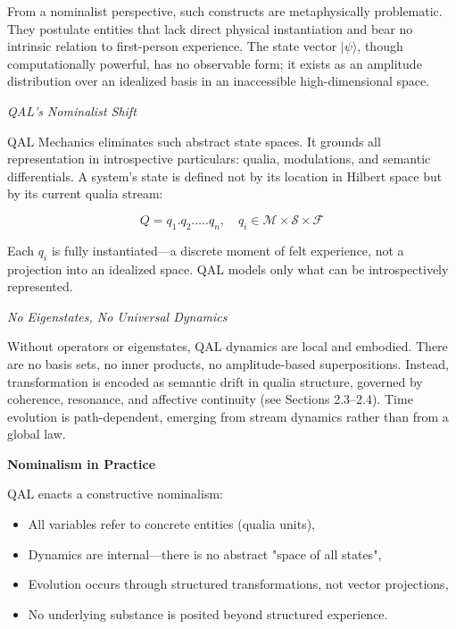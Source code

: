 \documentclass[11pt]{article}
\numberwithin{equation}{section} %
\begin{document}
From a nominalist perspective, such constructs are metaphysically problematic. They postulate entities that lack direct physical instantiation and bear no intrinsic relation to first-person experience. The state vector \( |\psi\rangle \), though computationally powerful, has no observable form; it exists as an amplitude distribution over an idealized basis in an inaccessible high-dimensional space.

\bigskip

\textit{QAL's Nominalist Shift}

QAL Mechanics eliminates such abstract state spaces. It grounds all representation in introspective particulars: qualia, modulations, and semantic differentials. A system's state is defined not by its location in Hilbert space but by its current qualia stream:

\begin{equation}
Q = q_1 . q_2 . \dots . q_n, \quad q_i \in \mathcal{M} \times \mathcal{S} \times \mathcal{F}
\end{equation}

Each \( q_i \) is fully instantiated---a discrete moment of felt experience, not a projection into an idealized space. QAL models only what can be introspectively represented.

\bigskip

\textit{No Eigenstates, No Universal Dynamics}

Without operators or eigenstates, QAL dynamics are local and embodied. There are no basis sets, no inner products, no amplitude-based superpositions. Instead, transformation is encoded as semantic drift in qualia structure, governed by coherence, resonance, and affective continuity (see Sections 2.3--2.4). Time evolution is path-dependent, emerging from stream dynamics rather than from a global law.

\bigskip

\textbf{Nominalism in Practice}

QAL enacts a constructive nominalism:
\begin{itemize}
  \item All variables refer to concrete entities (qualia units),
  \item Dynamics are internal---there is no abstract "space of all states",
  \item Evolution occurs through structured transformations, not vector projections,
  \item No underlying substance is posited beyond structured experience.
\end{itemize}
\end{document}
